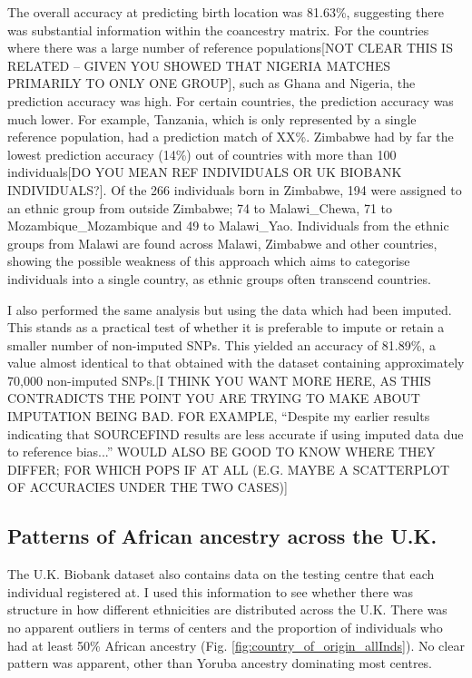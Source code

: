 The overall accuracy at predicting birth location was 81.63\%, suggesting there was substantial information within the coancestry matrix. For the countries where there was {\color{red}a large number of reference populations[NOT CLEAR THIS IS RELATED -- GIVEN YOU SHOWED THAT NIGERIA MATCHES PRIMARILY TO ONLY ONE GROUP]}, such as Ghana and Nigeria, the prediction accuracy was high. For certain countries, the prediction accuracy was much lower. For example, Tanzania, which is only represented by a single reference population, had a prediction match of XX\%. Zimbabwe had by far the lowest prediction accuracy (14\%) out of countries with more than {\color{red}100 individuals[DO YOU MEAN REF INDIVIDUALS OR UK BIOBANK INDIVIDUALS?]}. Of the 266 individuals born in Zimbabwe, 194 were assigned to an ethnic group from outside Zimbabwe; 74 to Malawi\_Chewa, 71 to Mozambique\_Mozambique and 49 to Malawi\_Yao. Individuals from the ethnic groups from Malawi are found across Malawi, Zimbabwe and other countries, showing the possible weakness of this approach which aims to categorise individuals into a single country, as ethnic groups often transcend countries. 

I also performed the same analysis but using the data which had been imputed. This stands as a practical test of whether it is preferable to impute or retain a smaller number of non-imputed SNPs. This yielded an accuracy of 81.89\%, a value almost identical to that obtained with the dataset containing approximately 70,000 non-imputed SNPs.{\color{red}[I THINK YOU WANT MORE HERE, AS THIS CONTRADICTS THE POINT YOU ARE TRYING TO MAKE ABOUT IMPUTATION BEING BAD. FOR EXAMPLE, ``Despite my earlier results indicating that SOURCEFIND results are less accurate if using imputed data due to reference bias...'' WOULD ALSO BE GOOD TO KNOW WHERE THEY DIFFER; FOR WHICH POPS IF AT ALL (E.G. MAYBE A SCATTERPLOT OF ACCURACIES UNDER THE TWO CASES)]}


\subsection{Patterns of African ancestry across the U.K.}

The U.K. Biobank dataset also contains data on the testing centre that each individual registered at. I used this information to see whether there was structure in how different ethnicities are distributed across the U.K. There was no apparent outliers in terms of centers and the proportion of individuals who had at least 50\% African ancestry (Fig. \ref{fig:country_of_origin_allInds}). No clear pattern was apparent, other than Yoruba ancestry dominating most centres. 
 
